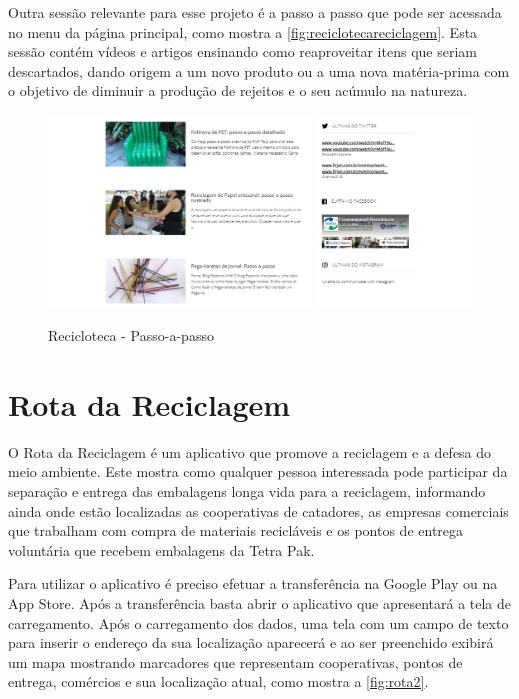 \documentclass[
	12pt,				%
	openany,			%
	twoside,			%
	a4paper,			%
	english,			%
	french,				%
	spanish,			%
	brazil				%
	]{abntex2}
\begin{document}
\newpage
Outra sessão relevante para esse projeto é a passo a passo que pode ser acessada no menu da página principal, como mostra a \autoref{fig:reciclotecareciclagem}. Esta sessão contém vídeos e artigos ensinando como reaproveitar itens que seriam descartados, dando origem a um novo produto ou a uma nova matéria-prima com o objetivo de diminuir a produção de rejeitos e o seu acúmulo na natureza.


\begin{figure}[h]
\centering
   \caption{Recicloteca - Passo-a-passo}
   \includegraphics[scale=0.45]{media/reciclotecareciclagem.jpg}
     \label{fig:reciclotecareciclagem}
\end{figure}



\newpage
\section{Rota da Reciclagem}

O Rota da Reciclagem é um aplicativo que promove a reciclagem e a defesa do meio ambiente. Este mostra como qualquer pessoa interessada pode participar da separação e entrega das embalagens longa vida para a reciclagem, informando ainda onde estão localizadas as cooperativas de catadores, as empresas comerciais que trabalham com compra de materiais recicláveis e os pontos de entrega voluntária que recebem embalagens da Tetra Pak\cite{rotareciclagem}.

Para utilizar o aplicativo é preciso efetuar a transferência na Google Play ou na App Store. Após a transferência basta abrir o aplicativo que apresentará a tela de carregamento. Após o carregamento dos dados, uma tela com um campo de texto para inserir o endereço da sua localização aparecerá e ao ser preenchido exibirá um mapa mostrando marcadores que representam cooperativas, pontos de entrega, comércios e sua localização atual, como mostra a \autoref{fig:rota2}.
    
\end{document}
